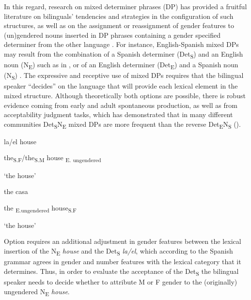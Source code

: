 \documentclass[output=paper]{langscibook}
\begin{document}
{In this regard, research on mixed determiner phrases (DP) has provided a fruitful literature on bilinguals’ tendencies and strategies in the configuration of such structures, as well as on the assignment or reassignment of gender features to (un)gendered nouns inserted in DP phrases containing a gender specified determiner from the other language} {\citep{BellamyParafitaCouto2022}}{. For instance, English-Spanish mixed DPs may result from the combination of a Spanish determiner (Det}{\textsubscript{S}}{) and an English noun (N}{\textsubscript{E}}{) such as in , or of an English determiner (Det}{\textsubscript{E}}{) and a Spanish noun (N}{\textsubscript{S}}{) . The expressive and receptive use of mixed DPs requires that the bilingual speaker “decides” on the language that will provide each lexical element in the mixed structure. Although theoretically both options are possible, there is robust evidence coming from early and adult spontaneous production, as well as from acceptability judgment tasks, which has demonstrated that in many different communities Det}{\textsubscript{S}}{N}{\textsubscript{E}} {mixed DPs  are more frequent than the reverse Det}{\textsubscript{E}}{N}{\textsubscript{S}} {} {(\citealt{HerringEtAl2010,JakeEtAl2002,LicerasEtAl2008,MoroQuintanilla2014,ParafitaCoutoEtAlinpress,ValdésKroff2016})}.

\ea\label{ex:ezeiza:1}
\ea\label{ex:ezeiza:1a}
 la/el   house

 {the}{\textsubscript{S.F}}{/the}{\textsubscript{S.M} }{house}{\textsubscript{ E. ungendered}}

 {‘the house’}

\ex\label{ex:ezeiza:1b}
{ the   casa}

 {the}{\textsubscript{ E.ungendered}} {house}{\textsubscript{S.F}}

 {‘the house’}

\z
\z

{Option  requires an additional adjustment in gender features between the lexical insertion of the N}{\textsubscript{E}} {\textit{house}} {and the Det}{\textsubscript{S}} {\textit{la/el}}{, which according to the Spanish grammar agrees in gender and number features with the lexical category that it determines. Thus, in order to evaluate the acceptance of the Det}{\textsubscript{S}} {the bilingual speaker needs to decide whether to attribute M or F gender to the (originally) ungendered N}{\textsubscript{E}} {\textit{house}}.
\end{document}
